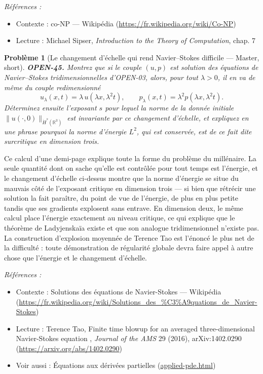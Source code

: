 \documentclass[11pt]{article}
\newtheorem{problem}{Problème}
\newenvironment{refs}{\par\small\noindent\emph{Références :}\begin{itemize}\setlength\itemsep{0pt}}{\end{itemize}\normalsize}
\begin{document}
\begin{refs}
\item Contexte : co-NP --- Wikipédia (\url{https://fr.wikipedia.org/wiki/Co-NP})
\item Lecture : Michael Sipser, \textit{Introduction to the Theory of Computation}, chap. 7
\end{refs}

\bigskip

\begin{problem}[{Le changement d'échelle qui rend Navier--Stokes difficile --- Master, short}]
\textbf{OPEN-45.} Montrez que si le couple $ (u, p) $ est solution
des équations de Navier--Stokes tridimensionnelles d'OPEN-03, alors, pour tout
$ \lambda > 0 $, il en va de même du couple redimensionné
\[ u_{\lambda}(x,t) = \lambda\, u(\lambda x, \lambda^{2} t), \qquad
p_{\lambda}(x,t) = \lambda^{2} p(\lambda x, \lambda^{2} t) . \]
Déterminez ensuite l'exposant $ s $ pour lequel la norme de la donnée initiale
$ \| u(\cdot,0) \|_{\dot{H}^{s}(\mathbb{R}^{3})} $ est invariante par ce changement
d'échelle, et expliquez en une phrase pourquoi la norme d'énergie $ L^{2} $, qui est
conservée, est de ce fait dite \textit{surcritique} en dimension trois.
\end{problem}

\noindent Ce calcul d'une demi-page explique toute la forme du problème du
millénaire. La seule quantité dont on sache qu'elle est contrôlée pour tout temps est
l'énergie, et le changement d'échelle ci-dessus montre que la norme d'énergie se situe du
mauvais côté de l'exposant critique en dimension trois --- si bien que rétrécir une solution
la fait paraître, du point de vue de l'énergie, de plus en plus petite tandis que ses
gradients explosent sans entrave. En dimension deux, le même calcul place l'énergie
exactement au niveau critique, ce qui explique que le théorème de Ladyjenskaïa existe et
que son analogue tridimensionnel n'existe pas. La construction d'explosion moyennée de
Terence Tao est l'énoncé le plus net de la difficulté : toute démonstration de régularité
globale devra faire appel à autre chose que l'énergie et le changement d'échelle.

\begin{refs}
\item Contexte : Solutions des équations de Navier-Stokes --- Wikipédia (\url{https://fr.wikipedia.org/wiki/Solutions_des_%C3%A9quations_de_Navier-Stokes})
\item Lecture : Terence Tao, \og{} Finite time blowup for an averaged three-dimensional Navier-Stokes equation \fg{}, \textit{Journal of the AMS} 29 (2016), arXiv:1402.0290 (\url{https://arxiv.org/abs/1402.0290})
\item Voir aussi : Équations aux dérivées partielles (\url{applied-pde.html})
\end{refs}
\end{document}

